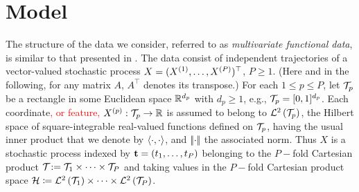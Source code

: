 \section{Model} %
\label{sec:model}

The structure of the data we consider, referred to as \emph{multivariate functional data}, is similar to that presented in \cite{happMultivariateFunctionalPrincipal2018a}. The data consist of independent trajectories of a vector-valued stochastic process $X = (X^{(1)}, \dots, X^{(P)})^\top$, $P\geq 1$. (Here and in the following, for any matrix $A$, $A^\top$ denotes its transpose.) For each $1 \leq p \leq P$, let $\mathcal{T}_{p}$ be a rectangle in some Euclidean space $\mathbb{R}^{d_p}$ with $d_p \geq 1$, e.g., $\mathcal{T}_{p} = [0,1]^{d_p}$. Each coordinate\textcolor{red}{, or feature,} $X^{(p)} : \mathcal{T}_{p} \rightarrow \mathbb{R}$ is assumed to belong to  $\mathcal{L}^{2}\left(\mathcal{T}_{p}\right)$, the Hilbert space of square-integrable real-valued functions defined on $\mathcal{T}_{p}$, having the usual inner product that we denote by $\left\langle\cdot, \cdot\right\rangle$, and $\left|\!\left|\cdot\right|\!\right|$ the associated norm. Thus $X$ is a stochastic process indexed by $\mathbf{t} = (t_1, \ldots, t_P)$ belonging to the $P-$fold Cartesian product $\mathcal{T}_{} : =\mathcal{T}_{1} \times \cdots \times \mathcal{T}_{P}$ and taking values in the $P-$fold Cartesian product space $\mathcal{H} \coloneqq \mathcal{L}^{2}\left(\mathcal{T}_{1}\right) \times \dots \times \mathcal{L}^{2}\left(\mathcal{T}_{P}\right)$. 


